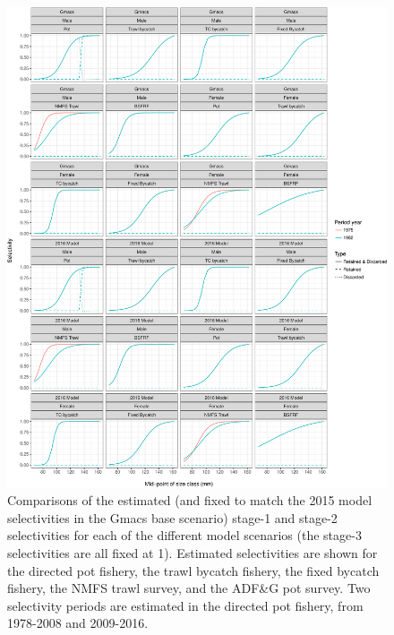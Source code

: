 \documentclass[]{article}
\begin{document}
\begin{figure}[htbp]
\centering
\includegraphics{bbrkc_files/figure-latex/selectivity-1.pdf}
\caption{Comparisons of the estimated (and fixed to match the 2015 model
selectivities in the Gmacs base scenario) stage-1 and stage-2
selectivities for each of the different model scenarios (the stage-3
selectivities are all fixed at 1). Estimated selectivities are shown for
the directed pot fishery, the trawl bycatch fishery, the fixed bycatch
fishery, the NMFS trawl survey, and the ADF\&G pot survey. Two
selectivity periods are estimated in the directed pot fishery, from
1978-2008 and 2009-2016.\label{fig:selectivity}}
\end{figure}
\end{document}
